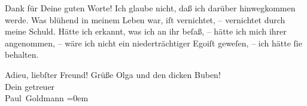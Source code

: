 \pstart
           Dank für Deine guten Worte! {\pb}Ich glaube nicht, daß
               ich darüber hinwegkommen werde.  Was blühend in meinem Leben war, iſt vernichtet, –
               vernichtet durch meine Schuld. Hätte ich erkannt, was ich an ihr beſaß, – hätte ich
               mich ihrer angenommen, – wäre ich nicht ein niederträchtiger Egoiſt geweſen, – ich
               hätte ſie behalten.\pend
           
\pstart
           Adieu, liebſter Freund! Grüße Olga und den
               dicken Buben! {\\[\baselineskip]}Dein
               getreuer {\\[\baselineskip]}\spacefill\mbox{Paul Goldmann}\pend
           \leftskip=0em{}\endnumbering{}  
      